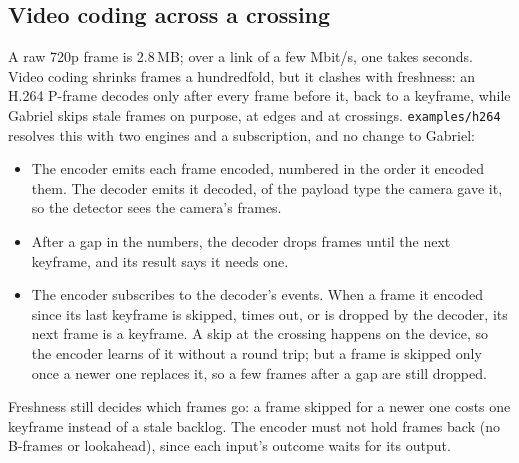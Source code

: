 \documentclass[11pt]{article}
\newcommand{\code}[1]{\texttt{#1}}
\begin{document}
\subsection{Video coding across a crossing}
\label{sec:video-coding}

A raw 720p frame is 2.8\,MB; over a link of a few Mbit/s, one takes seconds.
Video coding shrinks frames a hundredfold, but it clashes with freshness:
an H.264 P-frame decodes only after every frame before it, back to a
keyframe, while Gabriel skips stale frames on purpose, at edges and at
crossings. \code{examples/h264} resolves this with two engines and a
subscription, and no change to Gabriel:
\begin{center}
\end{center}
\begin{itemize}[nosep]
  \item The encoder emits each frame encoded, numbered in the order it
        encoded them. The decoder emits it decoded, of the payload type the
        camera gave it, so the detector sees the camera's frames.
  \item After a gap in the numbers, the decoder drops frames until the next
        keyframe, and its result says it needs one.
  \item The encoder subscribes to the decoder's events. When a frame it
        encoded since its last keyframe is skipped, times out, or is dropped
        by the decoder, its next frame is a keyframe. A skip at the crossing
        happens on the device, so the encoder learns of it without a round
        trip; but a frame is skipped only once a newer one replaces it, so a
        few frames after a gap are still dropped.
\end{itemize}
Freshness still decides which frames go: a frame skipped for a newer one costs
one keyframe instead of a stale backlog. The encoder must not hold frames back
(no B-frames or lookahead), since each input's outcome waits for its output.
\end{document}
